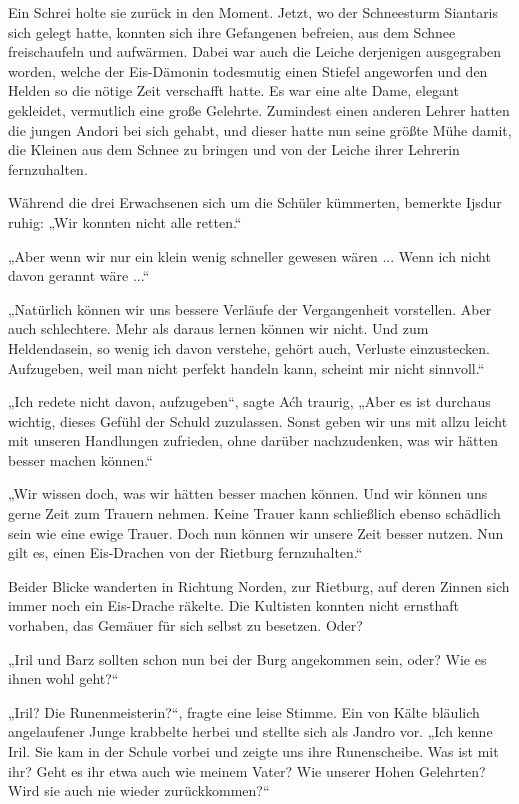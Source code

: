 Ein Schrei holte sie zurück in den Moment. Jetzt, wo der Schneesturm Siantaris sich gelegt hatte, konnten sich ihre Gefangenen befreien, aus dem Schnee freischaufeln und aufwärmen. Dabei war auch die Leiche derjenigen ausgegraben worden, welche der Eis-Dämonin todesmutig einen Stiefel angeworfen und den Helden so die nötige Zeit verschafft hatte. Es war eine alte Dame, elegant gekleidet, vermutlich eine große Gelehrte. Zumindest einen anderen Lehrer hatten die jungen Andori bei sich gehabt, und dieser hatte nun seine größte Mühe damit, die Kleinen aus dem Schnee zu bringen und von der Leiche ihrer Lehrerin fernzuhalten.

Während die drei Erwachsenen sich um die Schüler kümmerten, bemerkte Ijsdur ruhig: „Wir konnten nicht alle retten.“

„Aber wenn wir nur ein klein wenig schneller gewesen wären ... Wenn ich nicht davon gerannt wäre ...“

„Natürlich können wir uns bessere Verläufe der Vergangenheit vorstellen. Aber auch schlechtere. Mehr als daraus lernen können wir nicht. Und zum Heldendasein, so wenig ich davon verstehe, gehört auch, Verluste einzustecken. Aufzugeben, weil man nicht perfekt handeln kann, scheint mir nicht sinnvoll.“

„Ich redete nicht davon, aufzugeben“, sagte Aćh traurig, „Aber es ist durchaus wichtig, dieses Gefühl der Schuld zuzulassen. Sonst geben wir uns mit allzu leicht mit unseren Handlungen zufrieden, ohne darüber nachzudenken, was wir hätten besser machen können.“

„Wir wissen doch, was wir hätten besser machen können. Und wir können uns gerne Zeit zum Trauern nehmen. Keine Trauer kann schließlich ebenso schädlich sein wie eine ewige Trauer. Doch nun können wir unsere Zeit besser nutzen. Nun gilt es, einen Eis-Drachen von der Rietburg fernzuhalten.“

Beider Blicke wanderten in Richtung Norden, zur Rietburg, auf deren Zinnen sich immer noch ein Eis-Drache räkelte. Die Kultisten konnten nicht ernsthaft vorhaben, das Gemäuer für sich selbst zu besetzen. Oder?

„Iril und Barz sollten schon nun bei der Burg angekommen sein, oder? Wie es ihnen wohl geht?“

„Iril? Die Runenmeisterin?“, fragte eine leise Stimme. Ein von Kälte bläulich angelaufener Junge krabbelte herbei und stellte sich als Jandro vor. „Ich kenne Iril. Sie kam in der Schule vorbei und zeigte uns ihre Runenscheibe. Was ist mit ihr? Geht es ihr etwa auch wie meinem Vater? Wie unserer Hohen Gelehrten? Wird sie auch nie wieder zurückkommen?“

